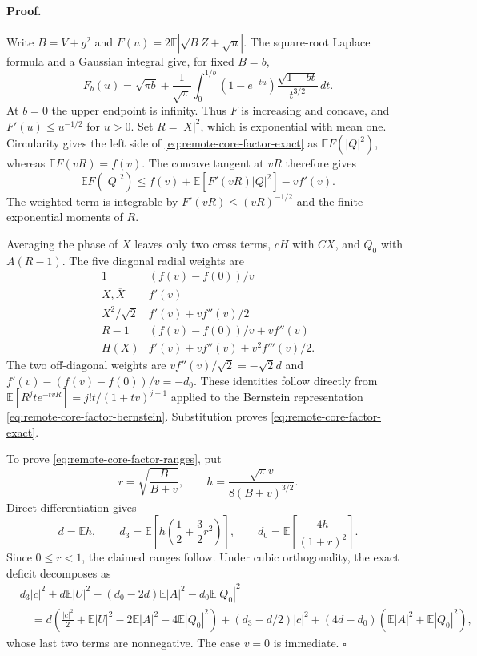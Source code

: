\paragraph{Proof.}
Write $B=V+g^2$ and $F(u)=2\mathbb E|\sqrt BZ+\sqrt u|$.
The square-root Laplace formula and a Gaussian integral give, for fixed $B=b$,
\begin{equation}\label{eq:remote-core-factor-bernstein}
 F_b(u)=\sqrt{\pi b}+\frac1{\sqrt\pi}
 \int_0^{1/b}(1-e^{-tu})\frac{\sqrt{1-bt}}{t^{3/2}}\,dt.
\end{equation}
At $b=0$ the upper endpoint is infinity. Thus $F$ is increasing and concave,
and $F'(u)\le u^{-1/2}$ for $u>0$. Set $R=|X|^2$, which is exponential with
mean one. Circularity gives the left side of
\eqref{eq:remote-core-factor-exact} as $\mathbb EF(|Q|^2)$, whereas
$\mathbb EF(vR)=f(v)$. The concave tangent at $vR$ therefore gives
\[
 \mathbb EF(|Q|^2)\le f(v)+\mathbb E[F'(vR)|Q|^2]-vf'(v).
\]
The weighted term is integrable by $F'(vR)\le(vR)^{-1/2}$ and the finite
exponential moments of $R$.

Averaging the phase of $X$ leaves only two cross terms, $cH$ with $CX$, and
$Q_0$ with $A(R-1)$. The five diagonal radial weights are
\[
\begin{array}{c|c}
1 &(f(v)-f(0))/v\\
X,\overline X &f'(v)\\
X^2/\sqrt2 &f'(v)+vf''(v)/2\\
R-1 &(f(v)-f(0))/v+vf''(v)\\
H(X) &f'(v)+vf''(v)+v^2f'''(v)/2.
\end{array}
\]
The two off-diagonal weights are $vf''(v)/\sqrt2=-\sqrt2d$ and
$f'(v)-(f(v)-f(0))/v=-d_0$. These identities follow directly from
$\mathbb E[R^j t e^{-tvR}]=j!t/(1+tv)^{j+1}$ applied to the Bernstein
representation \eqref{eq:remote-core-factor-bernstein}. Substitution proves
\eqref{eq:remote-core-factor-exact}.

To prove \eqref{eq:remote-core-factor-ranges}, put
\[
 r=\sqrt{\frac B{B+v}},\qquad
 h=\frac{\sqrt\pi v}{8(B+v)^{3/2}}.
\]
Direct differentiation gives
\[
 d=\mathbb Eh,\qquad
 d_3=\mathbb E\!\left[h\left(\frac12+\frac32r^2\right)\right],\qquad
 d_0=\mathbb E\!\left[\frac{4h}{(1+r)^2}\right].
\]
Since $0\le r<1$, the claimed ranges follow. Under cubic orthogonality, the
exact deficit decomposes as
\begin{align*}
 &d_3|c|^2+d\mathbb E|U|^2-(d_0-2d)\mathbb E|A|^2-d_0\mathbb E|Q_0|^2\\
 &\quad=d\left(\frac{|c|^2}2+\mathbb E|U|^2
                   -2\mathbb E|A|^2-4\mathbb E|Q_0|^2\right)
       +(d_3-d/2)|c|^2+(4d-d_0)(\mathbb E|A|^2+\mathbb E|Q_0|^2),
\end{align*}
whose last two terms are nonnegative. The case $v=0$ is immediate.
\hfill$\square$

